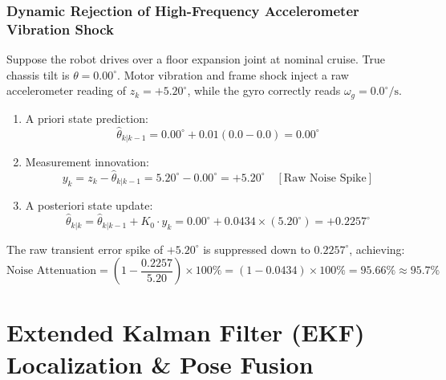 \documentclass[11pt, a4paper]{article}
\begin{document}
\subsubsection{Dynamic Rejection of High-Frequency Accelerometer Vibration Shock}
Suppose the robot drives over a floor expansion joint at nominal cruise. True chassis tilt is $\theta = 0.00^\circ$. Motor vibration and frame shock inject a raw accelerometer reading of $z_k = +5.20^\circ$, while the gyro correctly reads $\omega_g = 0.0^\circ/\text{s}$.
\begin{enumerate}
    \item A priori state prediction:
    \begin{equation}
        \hat{\theta}_{k|k-1} = 0.00^\circ + 0.01(0.0 - 0.0) = 0.00^\circ
    \end{equation}
    \item Measurement innovation:
    \begin{equation}
        y_k = z_k - \hat{\theta}_{k|k-1} = 5.20^\circ - 0.00^\circ = +5.20^\circ \quad [\text{Raw Noise Spike}]
    \end{equation}
    \item A posteriori state update:
    \begin{equation}
        \hat{\theta}_{k|k} = \hat{\theta}_{k|k-1} + K_0 \cdot y_k = 0.00^\circ + 0.0434 \times (5.20^\circ) = \mathbf{+0.2257^\circ}
    \end{equation}
\end{enumerate}
The raw transient error spike of $+5.20^\circ$ is suppressed down to $0.2257^\circ$, achieving:
\begin{equation}
    \text{Noise Attenuation} = \left(1 - \frac{0.2257}{5.20}\right) \times 100\% = \left(1 - 0.0434\right) \times 100\% = \mathbf{95.66\%} \approx \mathbf{95.7\%}
\end{equation}

\newpage
\section{Extended Kalman Filter (EKF) Localization \& Pose Fusion}
\end{document}
